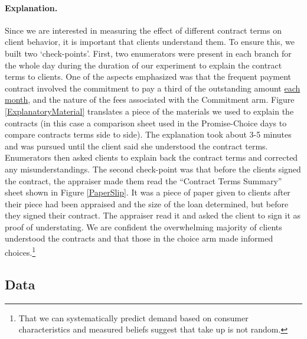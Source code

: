 \documentclass[oneside,11pt]{article}
\begin{document}
\paragraph{Explanation.} Since we are interested in measuring the effect of different contract terms on client behavior, it is important that clients understand them. To ensure this, we built two `check-points'.  First, two enumerators were present in each branch for the whole day during the duration of our experiment to explain the contract terms to clients. One of the aspects emphasized was that the frequent payment contract involved the commitment to pay a third of the outstanding amount \underline{each month}, and the nature of the fees associated with the Commitment arm. Figure \ref{ExplanatoryMaterial} translates a piece of the materials we used to explain the contracts (in this case a comparison sheet used in the Promise-Choice days to compare contracts terms side to side). The explanation took about 3-5 minutes and was pursued until the client said she understood the contract terms. Enumerators then asked clients to explain back the contract terms and corrected any misunderstandings. The second check-point was that before the clients signed the contract, the appraiser made them read the ``Contract Terms Summary'' sheet shown in Figure \ref{PaperSlip}. It was a piece of paper given to clients after their piece had been appraised and the size of the loan determined, but before they signed their contract. The appraiser read it and asked the client to sign it as proof of understating. %
We are confident the overwhelming majority of clients understood the contracts and that those in the choice arm made informed choices.\footnote{That we can systematically predict demand based on consumer characteristics and measured beliefs suggest that take up is not random.}


\subsection{Data}
\end{document}
